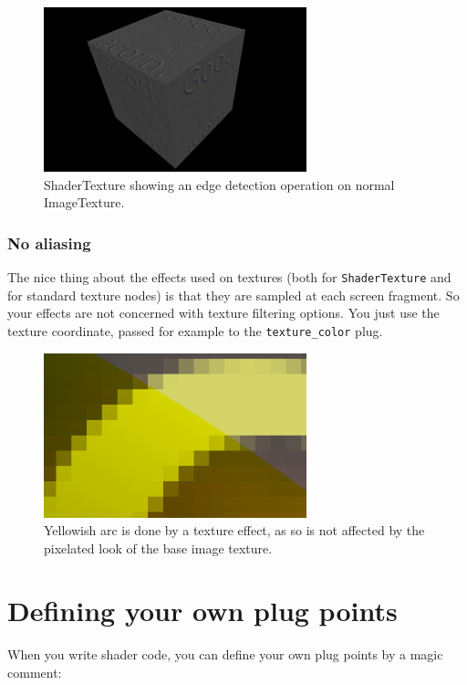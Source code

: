 \documentclass{acmsiggraph}                     %
\begin{document}
\begin{figure}[H]
  \centering
  \includegraphics[width=3in]{shader_texture_edge_detection}
  \caption{ShaderTexture showing an edge detection operation on normal ImageTexture.}
\end{figure}

\subsubsection{No aliasing}

The nice thing about the effects used on textures (both for \texttt{ShaderTexture}
and for standard texture nodes) is that they are sampled at each
screen fragment. So your effects are not concerned with texture filtering
options. You just use the texture coordinate, passed for example to the
\texttt{texture\_color} plug.

\begin{figure}[H]
  \centering
  \includegraphics[width=3in]{shader_texture_no_filtering_problems}
  \caption{Yellowish arc is done by a texture effect, as so is not
    affected by the pixelated look of the base image texture.}
\end{figure}

\section{Defining your own plug points}

When you write shader code, you can define your own plug points by a
magic comment:
\end{document}
